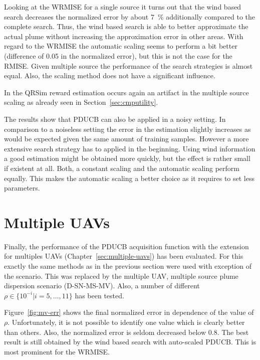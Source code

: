 Looking at the WRMISE for a single source it turns out that the wind based 
search decreases the normalized error by about \SI{7}{\percent} additionally 
compared to the complete search. Thus, the wind based search is able to better 
approximate the actual plume without increasing the approximation error in other 
areas. With regard to the WRMISE the automatic scaling seems to perform a bit 
better (difference of \num{0.05} in the normalized error), but this is not the 
case for the RMISE\@. Given multiple source the performance of the search 
strategies is almost equal.  Also, the scaling method does not have 
a significant influence.

In the QRSim reward estimation occurs again an artifact in the multiple source 
scaling as already seen in Section~\ref{sec:cmputility}.

The results show that PDUCB can also be applied in a noisy setting. In 
comparison to a noiseless setting the error in the estimation slightly increases 
as would be expected given the same amount of training samples. However a more 
extensive search strategy has to applied in the beginning. Using wind 
information a good estimation might be obtained more quickly, but the effect is 
rather small if existent at all. Both, a constant scaling and the automatic 
scaling perform equally. This makes the automatic scaling a better choice as it 
requires to set less parameters.

\section{Multiple UAVs}
Finally, the performance of the PDUCB acquisition function with the extension 
for multiples UAVs (Chapter~\ref{sec:multiple-uavs}) has been evaluated. For 
this exactly the same methods as in the previous section were used with 
exception of the scenario. This was replaced by the multiple UAV, multiple 
source plume dispersion scenario (D-SN-MS-MV). Also, a number of different $\rho 
\in \{10^{-i} | i = 5, \dots, 11\}$ has been tested.

Figure~\ref{fig:mv-err} shows the final normalized error in dependence of the 
value of $\rho$. Unfortunately, it is not possible to identify one value which 
is clearly better than others. Also, the normalized error is seldom decreased 
below \num{0.8}. The best result is still obtained by the wind based search with 
auto-scaled PDUCB\@. This is most prominent for the WRMISE\@.


